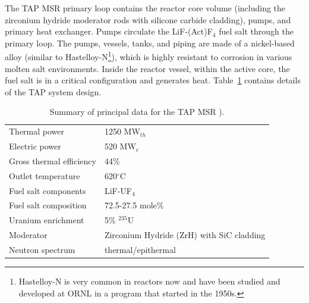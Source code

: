\documentclass{anstrans}
\begin{document}
The \gls{TAP} \gls{MSR} primary loop contains the reactor core volume 
(including the zirconium hydride moderator rods with silicone carbide 
cladding), pumps, and primary heat exchanger. Pumps circulate the 
LiF-(Act)F$_4$ fuel salt through the primary loop. The pumps, vessels, tanks, 
and piping are made of a nickel-based alloy (similar to Hastelloy-N\footnote{ 
Hastelloy-N  is very common in reactors now and have been studied and 
developed at \gls{ORNL} in a program that started in the 1950s.}), which is 
highly resistant to corrosion in various molten salt environments. Inside the 
reactor vessel, within the active core, 
the fuel salt is in a critical configuration and generates heat. 
Table~\ref{tab:tap_tab} contains details of the \gls{TAP} system design. 
\begin{table}[h!]
	\caption{Summary of principal data for the \gls{TAP} \gls{MSR} 	
	\cite{transatomic_power_corporation_technical_2016, 
	transatomic_power_corporation_neutronics_2016}). }
	\begin{tabularx}{\linewidth}{X  X }
		\hline
		Thermal power		& 1250 MW$_{th}  $       
		\\ 
		Electric power		& 520 MW$_e  $ 			 
		\\ 
		Gross thermal efficiency 	& 44\%     				 
		\\  
		Outlet temperature			& 620$^{\circ}$C         
		\\ 
		Fuel salt components        & LiF-UF$_4$				 \\  
		Fuel salt composition       & 72.5-27.5 mole\%			 
		\\  
		Uranium enrichment          & 5\% $^{235}$U          	 \\
		Moderator & Zirconium Hydride (ZrH) with SiC 
		cladding \\
		Neutron spectrum						& 
		thermal/epithermal                 \\
		\hline
	\end{tabularx}
	\label{tab:tap_tab}
\end{table}
\end{document}
